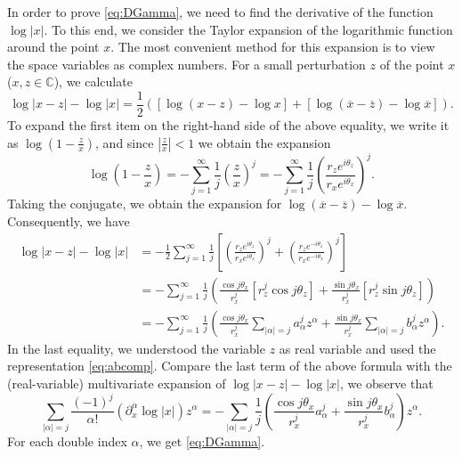 In order to prove \eqref{eq:DGamma}, we need to find the
derivative of the function $\log |x|$. To this end, we consider
the Taylor expansion of the logarithmic function around the point
$x$. The most convenient method for this expansion is to view the
space variables as complex numbers. For a small perturbation $z$
of the point $x$ ($x, z \in \mathbb{C}$), we calculate
\begin{equation*}
\log |x-z| - \log|x|= \frac{1}{2} \left([\log (x - z) - \log x ]+
[\log (\overline{x} - \overline{z}) - \log \overline{x}] \right).
\end{equation*}
To expand the first item on the right-hand side of the above
equality, we write it as $\log (1-\frac{z}{x})$, and since
$|\frac{z}{x}| < 1$ we obtain the expansion
\begin{equation*}
\log (1- \frac{z}{x}) = -\sum_{j=1}^\infty \frac{1}{j}
\left(\frac{z}{x}\right)^j = -\sum_{j=1}^\infty \frac{1}{j} \left(
\frac{r_z e^{i\theta_z}}{r_x e^{i\theta_x}} \right)^j.
\end{equation*}
Taking the conjugate, we obtain the expansion for
$\log(\overline{x} - \overline{z}) - \log \overline{x}$.
Consequently, we have
\begin{equation*}
\begin{aligned}
\log |x-z| - \log|x| &= -\frac{1}{2} \sum_{j=1}^\infty \frac{1}{j} \left[ \left( \frac{r_z e^{i\theta_z}}{r_x e^{i\theta_x}} \right)^j + \left( \frac{r_z e^{-i\theta_z}}{r_x e^{-i\theta_x}} \right)^j \right]\\
&= -\sum_{j=1}^\infty \frac{1}{j} \left(\frac{\cos j\theta_x}{r_x^j} [r_z^j \cos j\theta_z] + \frac{\sin j\theta_x}{r_x^j} [r_z^j \sin j\theta_z] \right)\\
&= -\sum_{j=1}^\infty \frac{1}{j} \left(\frac{\cos
j\theta_x}{r_x^j} \sum_{|\alpha| = j} a^j_\alpha z^\alpha +
\frac{\sin j\theta_x}{r_x^j} \sum_{|\alpha| = j} b^j_\alpha
z^\alpha  \right).
\end{aligned}
\end{equation*}
In the last equality, we understood the variable $z$ as real
variable and used the representation \eqref{eq:abcomp}. Compare
the last term of the above formula with the (real-variable)
multivariate expansion of $\log |x-z| - \log |x|$, we observe that
\begin{equation*}
\sum_{|\alpha| = j} \frac{(-1)^j}{\alpha!} (\partial^\alpha_x
\log|x|) z^\alpha = -\sum_{|\alpha| = j} \frac{1}{j}
\left(\frac{\cos j\theta_x}{r_x^j}  a^j_\alpha + \frac{\sin
j\theta_x}{r_x^j} b^j_\alpha  \right)z^\alpha .
\end{equation*}
For each double index $\alpha$, we get \eqref{eq:DGamma}.
